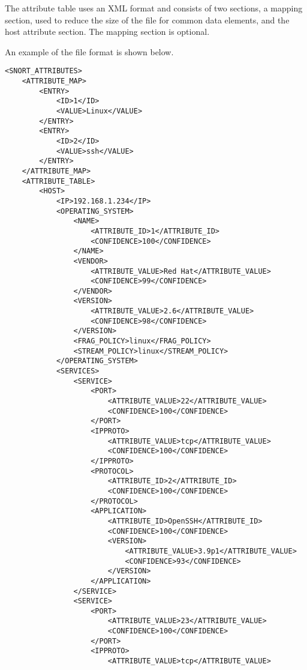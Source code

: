 \documentclass[english]{report}
\begin{document}
The attribute table uses an XML format and consists of two sections, a mapping
section, used to reduce the size of the file for common data elements, and the
host attribute section.  The mapping section is optional.

An example of the file format is shown below.

\begin{verbatim}
<SNORT_ATTRIBUTES>
    <ATTRIBUTE_MAP>
        <ENTRY>
            <ID>1</ID>
            <VALUE>Linux</VALUE>
        </ENTRY>
        <ENTRY>
            <ID>2</ID>
            <VALUE>ssh</VALUE>
        </ENTRY>
    </ATTRIBUTE_MAP>
    <ATTRIBUTE_TABLE>
        <HOST>
            <IP>192.168.1.234</IP>
            <OPERATING_SYSTEM>
                <NAME>
                    <ATTRIBUTE_ID>1</ATTRIBUTE_ID>
                    <CONFIDENCE>100</CONFIDENCE>
                </NAME>
                <VENDOR>
                    <ATTRIBUTE_VALUE>Red Hat</ATTRIBUTE_VALUE>
                    <CONFIDENCE>99</CONFIDENCE>
                </VENDOR>
                <VERSION>
                    <ATTRIBUTE_VALUE>2.6</ATTRIBUTE_VALUE>
                    <CONFIDENCE>98</CONFIDENCE>
                </VERSION>
                <FRAG_POLICY>linux</FRAG_POLICY>
                <STREAM_POLICY>linux</STREAM_POLICY>
            </OPERATING_SYSTEM>
            <SERVICES>
                <SERVICE>
                    <PORT>
                        <ATTRIBUTE_VALUE>22</ATTRIBUTE_VALUE>
                        <CONFIDENCE>100</CONFIDENCE>
                    </PORT>
                    <IPPROTO>
                        <ATTRIBUTE_VALUE>tcp</ATTRIBUTE_VALUE>
                        <CONFIDENCE>100</CONFIDENCE>
                    </IPPROTO>
                    <PROTOCOL>
                        <ATTRIBUTE_ID>2</ATTRIBUTE_ID>
                        <CONFIDENCE>100</CONFIDENCE>
                    </PROTOCOL>
                    <APPLICATION>
                        <ATTRIBUTE_ID>OpenSSH</ATTRIBUTE_ID>
                        <CONFIDENCE>100</CONFIDENCE>
                        <VERSION>
                            <ATTRIBUTE_VALUE>3.9p1</ATTRIBUTE_VALUE>
                            <CONFIDENCE>93</CONFIDENCE>
                        </VERSION>
                    </APPLICATION>
                </SERVICE>
                <SERVICE>
                    <PORT>
                        <ATTRIBUTE_VALUE>23</ATTRIBUTE_VALUE>
                        <CONFIDENCE>100</CONFIDENCE>
                    </PORT>
                    <IPPROTO>
                        <ATTRIBUTE_VALUE>tcp</ATTRIBUTE_VALUE>

\end{verbatim}
\end{document}
